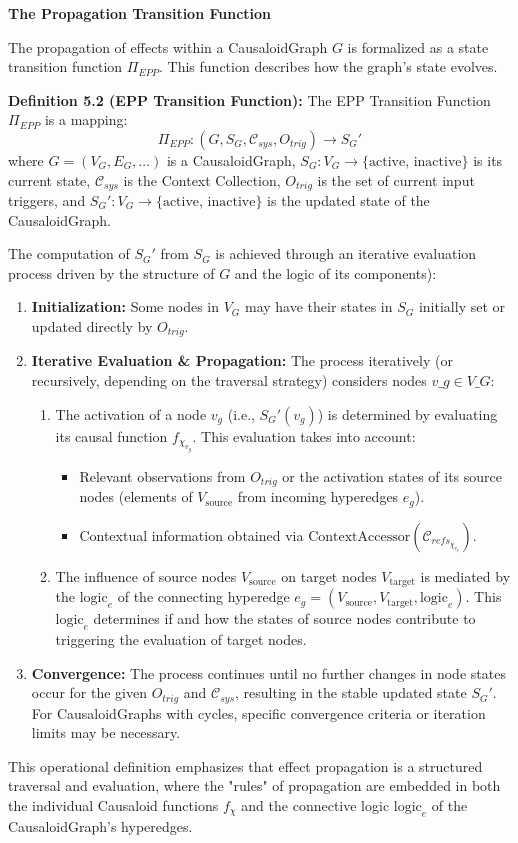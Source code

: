 \textbf{The Propagation Transition Function}

The propagation of effects within a CausaloidGraph \(G\) is formalized as a state transition function \(\Pi_{EPP}\). This function describes how the graph's state evolves.

\textbf{Definition 5.2 (EPP Transition Function):} The EPP Transition Function \(\Pi_{EPP}\) is a mapping:
\[ \Pi_{EPP} : (G, S_G, \mathcal{C}_{sys}, O_{trig}) \to S_G' \]
where \(G=(V_G, E_G, \dots)\) is a CausaloidGraph, \(S_G: V_G \to \{\text{active, inactive}\}\) is its current state, \(\mathcal{C}_{sys}\) is the Context Collection, \(O_{trig}\) is the set of current input triggers, and \(S_G': V_G \to \{\text{active, inactive}\}\) is the updated state of the CausaloidGraph.

The computation of \(S_G'\) from \(S_G\) is achieved through an iterative evaluation process driven by the structure of \(G\) and the logic of its components):
\begin{enumerate}
    \item \textbf{Initialization:} Some nodes in \(V_G\) may have their states in \(S_G\) initially set or updated directly by \(O_{trig}\).
    \item \textbf{Iterative Evaluation \& Propagation:} The process iteratively (or recursively, depending on the traversal strategy) considers nodes \(v\_g \in V\_G\):
    \begin{enumerate}
        \item The activation of a node \(v_g\) (i.e., \(S_G'(v_g)\)) is determined by evaluating its causal function \(f_{\chi_{v_g}}\). This evaluation takes into account:
        \begin{itemize}
            \item Relevant observations from \(O_{trig}\) or the activation states of its source nodes (elements of \(V_{\text{source}}\) from incoming hyperedges \(e_g\)).
            \item Contextual information obtained via \(\text{ContextAccessor}(\mathcal{C}_{refs_{\chi_{v_g}}})\).
        \end{itemize}
        \item The influence of source nodes \(V_{\text{source}}\) on target nodes \(V_{\text{target}}\) is mediated by the \(\text{logic}_e\) of the connecting hyperedge \(e_g = (V_{\text{source}}, V_{\text{target}}, \text{logic}_e)\). This \(\text{logic}_e\) determines if and how the states of source nodes contribute to triggering the evaluation of target nodes.
    \end{enumerate}
    \item \textbf{Convergence:} The process continues until no further changes in node states occur for the given \(O_{trig}\) and \(\mathcal{C}_{sys}\), resulting in the stable updated state \(S_G'\). For CausaloidGraphs with cycles, specific convergence criteria or iteration limits may be necessary.
\end{enumerate}
This operational definition emphasizes that effect propagation is a structured traversal and evaluation, where the "rules" of propagation are embedded in both the individual Causaloid functions \(f_\chi\) and the connective logic \(\text{logic}_e\) of the CausaloidGraph's hyperedges.

